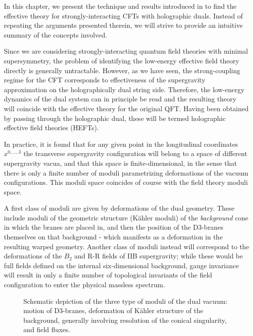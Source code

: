 \label{chap:heft}In this chapter, we present the technique and results introduced in \cite{MZ} to find the effective theory for strongly-interacting CFTs with holographic duals. Instead of repeating the arguments presented therein, we will strive to provide an intuitive summary of the concepts involved.

Since we are considering strongly-interacting quantum field theories with minimal supersymmetry, the problem of identifying the low-energy effective field theory directly is generally untractable. However, as we have seen, the strong-coupling regime for the CFT corresponds to effectiveness of the supergravity approximation on the holographically dual string side. Therefore, the low-energy dynamics of the dual system can in principle be read and the resulting theory will coincide with the effective theory for the original QFT. Having been obtained by passing through the holographic dual, these will be termed holographic effective field theories (HEFTs).

In practice, it is found that for any given point in the longitudinal coordinates $x^{0,\ldots,3}$ the transverse supergravity configuration will belong to a space of different supergravity vacua, and that this space is finite-dimensional, in the sense that there is only a finite number of moduli parametrizing deformations of the vacuum configurations. This moduli space coincides of course with the field theory moduli space.

A first class of moduli are given by deformations of the dual geometry. These include moduli of the geometric structure (K\"ahler moduli) of the \emph{background} cone in which the branes are placed in, and then the position of the D3-branes themselves on that background - which manifests as a deformation in the resulting warped geometry. Another class of moduli instead will correspond to the deformations of the $B_2$ and R-R fields of IIB supergravity; while these would be full fields defined on the internal six-dimensional background, gauge invariance will result in only a finite number of topological invariants of the field configuration to enter the physical massless spectrum.


\begin{figure}
\centering
\def\svgwidth{200pt}
\captionsetup{width=0.8\textwidth}

\caption{Schematic depiction of the three type of moduli of the dual vacuum: motion of D3-branes, deformation of K\"ahler structure of the background, generally involving resolution of the conical singularity, and field fluxes.}
\end{figure}


